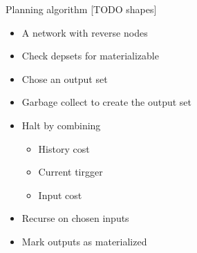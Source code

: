 \begin{frame}{Planning algorithm [TODO shapes]}
  \begin{itemize}
  \item A network with reverse nodes
  \item Check depsets for materializable
  \item Chose an output set
  \item Garbage collect to create the output set
  \item Halt by combining
    \begin{itemize}
    \item History cost
    \item Current tirgger
    \item Input cost
    \end{itemize}
  \item Recurse on chosen inputs
  \item Mark outputs as materialized
  \end{itemize}
\end{frame}


\newcommand\planner[9]{
  \begin{tikzdiagram_h}
    \tikzset{node distance=2cm};
    \tikzset{nnode/.style={ellipse,draw}};
    \tikzset{tnode/.style={rectangle,draw}};

    \node[nnode] (a) [fill=#1] {A};
    \node[nnode] (b) [right of=a,fill=#2] {B};
    \node[nnode] (c) [right of=b,fill=#3] {C};
    \node[tnode] (to1) [below of = b] {};
    \path (to1) edge (a);
    \path (to1) edge (b);
    \path (to1) edge (c);
    \node[nnode] (d) [below left of = to1,fill=#4] {X};
    \node[nnode] (e) [below right of = to1,fill=#5] {E};
    \path (to1) edge (e);
    \path (to1) edge (d);

    \node[tnode] (to2) [above left of = d] {};
    \node[nnode] (f) [above left of = to2,fill=#6] {F};
    \node[nnode] (g) [below left of = to2,fill=#7] {G};
    \path (to2) edge (d);
    \path (to2) edge (f);
    \path (to2) edge (g);

    \node[tnode] (tu1) [below of = d] {};
    \node[nnode] (h) [below left of = tu1,fill=#8] {H};
    \node[nnode] (i) [below right of = tu1,fill=#9] {I};
    \path (tu1) edge (d);
    \path (tu1) edge (h);
    \path (tu1) edge (i);
  \end{tikzdiagram_h}
}

\renewcommand\n{none}
\newcommand\g{green!30}
\renewcommand\o{gray!30}
\newcommand\oo{gray!20}
\newcommand\inputsetsmsg{For each input set}

